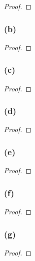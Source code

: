 \documentclass[14pt]{extarticle}
\begin{document}
\begin{proof}

\end{proof}

\subsubsection{(b)}

\begin{proof}

\end{proof}

\subsubsection{(c)}

\begin{proof}

\end{proof}

\subsubsection{(d)}

\begin{proof}

\end{proof}

\subsubsection{(e)}

\begin{proof}

\end{proof}

\subsubsection{(f)}

\begin{proof}

\end{proof}

\subsubsection{(g)}

\begin{proof}

\end{proof}
\end{document}
